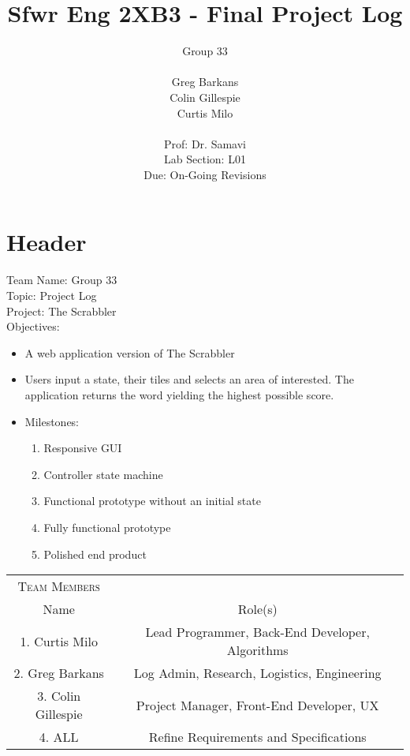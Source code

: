 \documentclass[10pt, oneside]{article}
\title{Sfwr Eng 2XB3 - Final Project Log}
\author{
	Group 33   \\ \\ 
	Greg Barkans \\
	Colin Gillespie \\
	Curtis Milo \\
	 \vspace{2cm} \\
	Prof: Dr. Samavi \\
	Lab Section: L01 \\
	Due: On-Going Revisions \\	
}
\date{}
\begin{document}
\maketitle
\newpage


\section{Header}
Team Name: Group 33 \\
Topic: Project Log \\
Project: The Scrabbler \\
Objectives:
\begin{itemize}
	\item A web application version of The Scrabbler
	\item Users input a state, their tiles and selects an area of interested.  The application returns the word yielding the highest possible score.
	\item Milestones:
	\begin{enumerate}[\# 1]
		\item Responsive GUI
		\item Controller state machine
		\item Functional prototype without an initial state
		\item Fully functional prototype
		\item Polished end product
	\end{enumerate}
\end{itemize}

\vspace{1cm}

\begin{tabular}{|c|c|}
	\hline
	\textsc{Team Members} & \\
	Name & Role(s) \\
	\hline
	1. Curtis Milo & Lead Programmer, Back-End Developer, Algorithms  \\
	\hline
	2. Greg Barkans & Log Admin, Research, Logistics, Engineering \\
	\hline
	3. Colin Gillespie & Project Manager, Front-End Developer, UX \\
	\hline
	4. ALL & Refine Requirements and Specifications \\
	\hline
\end{tabular}
\end{document}
